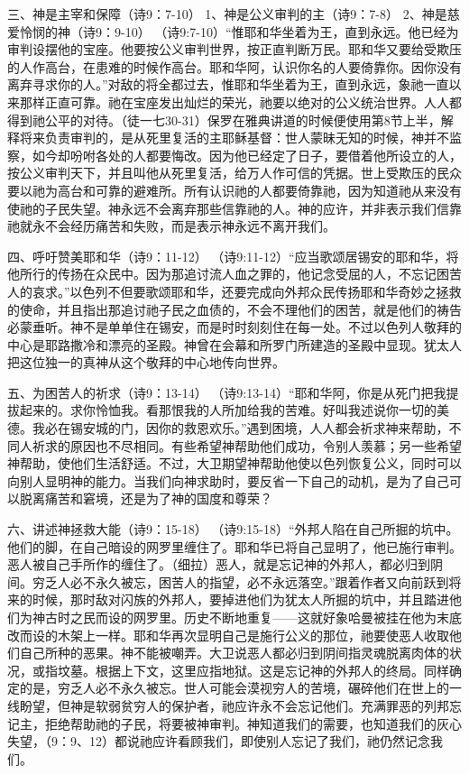\begin{itemize}
三、神是主宰和保障（诗9：7-10）
1、神是公义审判的主（诗9：7-8）
2、神是慈爱怜悯的神（诗9：9-10）
（诗9:7-10）“惟耶和华坐着为王，直到永远。他已经为审判设摆他的宝座。他要按公义审判世界，按正直判断万民。耶和华又要给受欺压的人作高台，在患难的时候作高台。耶和华阿，认识你名的人要倚靠你。因你没有离弃寻求你的人。”对敌的将全都过去，惟耶和华坐着为王，直到永远，象祂一直以来那样正直可靠。祂在宝座发出灿烂的荣光，祂要以绝对的公义统治世界。人人都得到祂公平的对待。（徒一七30-31）保罗在雅典讲道的时候便使用第8节上半，解释将来负责审判的，是从死里复活的主耶稣基督：世人蒙昧无知的时候，神并不监察，如今却吩咐各处的人都要悔改。因为他已经定了日子，要借着他所设立的人，按公义审判天下，并且叫他从死里复活，给万人作可信的凭据。世上受欺压的民众要以祂为高台和可靠的避难所。所有认识祂的人都要倚靠祂，因为知道祂从来没有使祂的子民失望。神永远不会离弃那些信靠祂的人。神的应许，并非表示我们信靠祂就永不会经历痛苦和失败，而是表示神永远不离开我们。

四、呼吁赞美耶和华（诗9：11-12）
（诗9:11-12）“应当歌颂居锡安的耶和华，将他所行的传扬在众民中。因为那追讨流人血之罪的，他记念受屈的人，不忘记困苦人的哀求。”以色列不但要歌颂耶和华，还要完成向外邦众民传扬耶和华奇妙之拯救的使命，并且指出那追讨祂子民之血债的，不会不理他们的困苦，就是他们的祷告必蒙垂听。神不是单单住在锡安，而是时时刻刻住在每一处。不过以色列人敬拜的中心是耶路撒冷和漂亮的圣殿。神曾在会幕和所罗门所建造的圣殿中显现。犹太人把这位独一的真神从这个敬拜的中心地传向世界。

五、为困苦人的祈求（诗9：13-14）
（诗9:13-14）“耶和华阿，你是从死门把我提拔起来的。求你怜恤我。看那恨我的人所加给我的苦难。好叫我述说你一切的美德。我必在锡安城的门，因你的救恩欢乐。”遇到困境，人人都会祈求神来帮助，不同人祈求的原因也不尽相同。有些希望神帮助他们成功，令别人羡慕；另一些希望神帮助，使他们生活舒适。不过，大卫期望神帮助他使以色列恢复公义，同时可以向别人显明神的能力。当我们向神求助时，要反省一下自己的动机，是为了自己可以脱离痛苦和窘境，还是为了神的国度和尊荣？

六、讲述神拯救大能（诗9：15-18）
（诗9:15-18）“外邦人陷在自己所掘的坑中。他们的脚，在自己暗设的网罗里缠住了。耶和华已将自己显明了，他已施行审判。恶人被自己手所作的缠住了。（细拉）恶人，就是忘记神的外邦人，都必归到阴间。穷乏人必不永久被忘，困苦人的指望，必不永远落空。”跟着作者又向前跃到将来的时候，那时敌对闪族的外邦人，要掉进他们为犹太人所掘的坑中，并且踏进他们为神古时之民而设的网罗里。历史不断地重复——这就好象哈曼被挂在他为末底改而设的木架上一样。耶和华再次显明自己是施行公义的那位，祂要使恶人收取他们自己所种的恶果。神不能被嘲弄。大卫说恶人都必归到阴间指灵魂脱离肉体的状况，或指坟墓。根据上下文，这里应指地狱。这是忘记神的外邦人的终局。同样确定的是，穷乏人必不永久被忘。世人可能会漠视穷人的苦境，碾碎他们在世上的一线盼望，但神是软弱贫穷人的保护者，祂应许永不会忘记他们。充满罪恶的列邦忘记主，拒绝帮助祂的子民，将要被神审判。神知道我们的需要，也知道我们的灰心失望，（9：9、12）都说祂应许看顾我们，即使别人忘记了我们，祂仍然记念我们。


\end{itemize}
